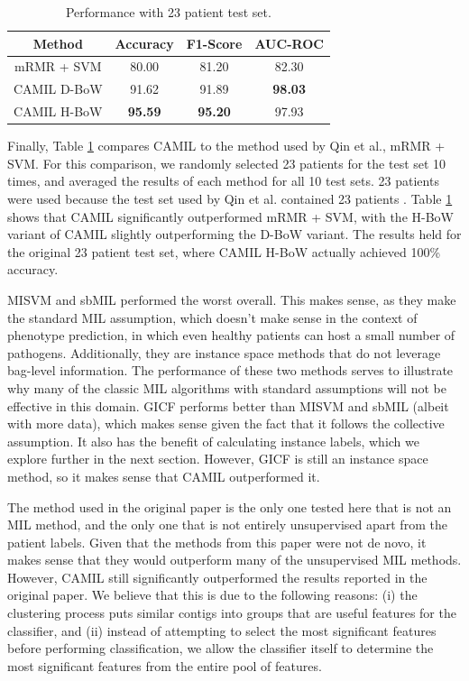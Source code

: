 \begin{table}[h]
\begin{center}
\caption{Performance with 23 patient test set.} 
\label{tab:test-comp}
\begin{tabular}{|c|ccc|}\hline
Method & Accuracy & F1-Score & AUC-ROC\\\hline
mRMR + SVM & 80.00 & 81.20 & 82.30\\\hline 
CAMIL D-BoW & 91.62 & 91.89 & \bf{98.03}\\\hline
CAMIL H-BoW & \bf{95.59} & \bf{95.20} & 97.93\\\hline
\end{tabular}
\end{center}
\end{table}

Finally, Table \ref{tab:test-comp} compares CAMIL to the method used by Qin et al., mRMR + SVM. For this comparison, we randomly selected 23 patients for the test set 10 times, and averaged the results of each method for all 10 test sets. 23 patients were used because the test set used by Qin et al. contained 23 patients \cite{qin041012}. Table \ref{tab:test-comp} shows that CAMIL significantly outperformed mRMR + SVM, with the H-BoW variant of CAMIL slightly outperforming the D-BoW variant. The results held for the original 23 patient test set, where CAMIL H-BoW actually achieved 100\% accuracy.

MISVM and sbMIL performed the worst overall. This makes sense, as they make the standard MIL assumption, which doesn't make sense in the context of phenotype prediction, in which even healthy patients can host a small number of pathogens. Additionally, they are instance space methods that do not leverage bag-level information. The performance of these two methods serves to illustrate why many of the classic MIL algorithms with standard assumptions will not be effective in this domain. GICF performs better than MISVM and sbMIL (albeit with more data), which makes sense given the fact that it follows the collective assumption. It also has the benefit of calculating instance labels, which we explore further in the next section. However, GICF is still an instance space method, so it makes sense that CAMIL outperformed it.

The method used in the original paper is the only one tested here that is not an MIL method, and the only one that is not entirely unsupervised apart from the patient labels. Given that the methods from this paper were not de novo, it makes sense that they would outperform many of the unsupervised MIL methods. However, CAMIL still significantly outperformed the results reported in the original paper. We believe that this is due to the following reasons: (i) the clustering process puts similar contigs into groups that are useful features for the classifier, and (ii) instead of attempting to select the most significant features before performing classification, we allow the classifier itself to determine the most significant features from the entire pool of features.

